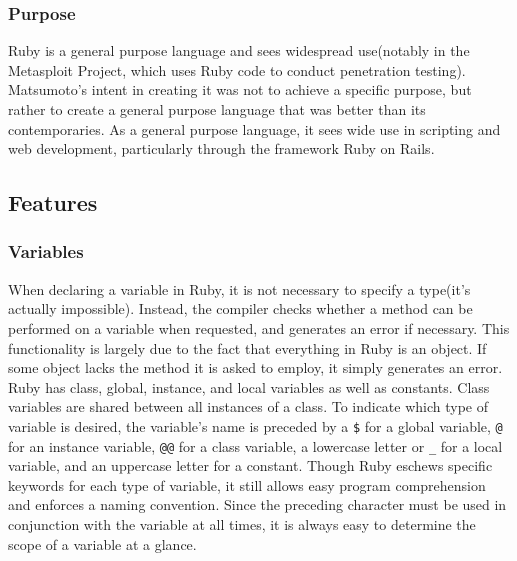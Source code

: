 \documentclass[12pt]{article}
\begin{document}
\subsubsection{Purpose}
Ruby is a general purpose language and sees widespread use(notably in the Metasploit Project, which uses Ruby code to conduct penetration testing)\cite{metasploit}\cite{generalRb}.  Matsumoto's intent in creating it was not to achieve a specific purpose, but rather to create a general purpose language that was better than its contemporaries\cite{rubyinterview}. As a general purpose language, it sees wide use in scripting and web development, particularly through the framework Ruby on Rails.




\subsection{Features}

\subsubsection{Variables}
When declaring a variable in Ruby, it is not necessary to specify a type(it's actually impossible). Instead, the compiler checks whether a method can be performed on a variable when requested, and generates an error if necessary. This functionality is largely due to the fact that everything in Ruby is an object. If some object lacks the method it is asked to employ, it simply generates an error.
Ruby has class, global, instance, and local variables as well as constants\cite{rbvars}. Class variables are shared between all instances of a class. To indicate which type of variable is desired, the variable's name is preceded by a \verb|$| for a global variable, \verb|@| for an instance variable, \verb|@@| for a class variable, a lowercase letter or \verb|_| for a local variable, and an uppercase letter for a constant. Though Ruby eschews specific keywords for each type of variable, it still allows easy program comprehension and enforces a naming convention. Since the preceding character must be used in conjunction with the variable at all times, it is always easy to determine the scope of a variable at a glance.
\end{document}
